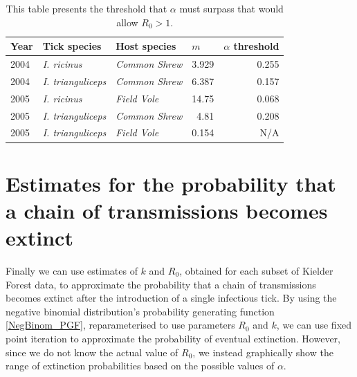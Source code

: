 \documentclass{article}
\begin{document}
\begin{table}[h]
	\begin{mdframed}[backgroundcolor=grey250,rightline=false,leftline=false,topline=false]
	\centering
	\begin{tabular}{|l|l|l|r|r|}
		\hline
		\textbf{Year} & \textbf{Tick species} & \textbf{Host species} & \multicolumn{1}{l|}{\textbf{$m$}} & \multicolumn{1}{l|}{\textbf{$ \alpha $ threshold}} \\ \hline
		2004          & \textit{I. ricinus}            & \textit{Common Shrew}          & 3.929                             & 0.255                                              \\ \hline
		2004          & \textit{I. trianguliceps}      & \textit{Common Shrew}         & 6.387                             & 0.157                                              \\ \hline
		2005          & \textit{I. ricinus}            & \textit{Field Vole}           & 14.75                             & 0.068                                              \\ \hline
		2005          & \textit{I. trianguliceps}      & \textit{Common Shrew}          & 4.81                              & 0.208                                              \\ \hline
		2005          & \textit{I. trianguliceps}      & \textit{Field Vole}            & 0.154                             & N/A                                                \\ \hline
	\end{tabular}
	\caption{This table presents the threshold that $ \alpha $ must surpass that would allow $ R_0 > 1 $.} 
	\label{tab:alpha_threshold}
	\end{mdframed}
\end{table}

\newpage

\section{Estimates for the probability that a chain of transmissions becomes extinct} 

Finally we can use estimates of $ k $ and $ R_0 $, obtained for each subset of Kielder Forest data, to approximate the probability that a chain of transmissions becomes extinct after the introduction of a single infectious tick. By using the negative binomial distribution's probability generating function \eqref{NegBinom_PGF}, reparameterised to use parameters $ R_0 $ and $ k $, we can use fixed point iteration to approximate the probability of eventual extinction. However, since we do not know the actual value of $ R_0 $, we instead graphically show the range of extinction probabilities based on the possible values of $ \alpha $.
\end{document}
